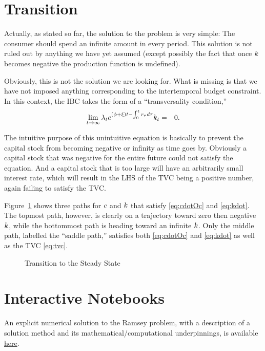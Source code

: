 \documentclass{handout}
\begin{document}
\section{Transition}

Actually, as stated so far, the solution to the problem is very simple: The
consumer should spend an infinite amount in every period.  This solution is 
not ruled out by anything we have yet assumed (except possibly the fact that
once ${k}$ becomes negative the production function is undefined).  

Obviously, this is not the solution we are looking for.  What is missing is
that we have not imposed anything corresponding to the intertemporal 
budget constraint.  In this context, the IBC takes the form of a ``transversality
condition,'' 
\begin{eqnarray}
  \label{eq:tvc}
  \lim_{t \rightarrow \infty} \lambda_{t} e^{(\phi +\xi) t - \int_{0}^{t} r_{\tau} d\tau }k_{t} & = & 0.
\end{eqnarray}

The intuitive purpose of this unintuitive equation is basically to prevent
the capital stock from becoming negative or infinity as time goes by.  
Obviously a capital stock that was negative for the entire future could not 
satisfy the equation.  And a capital stock that is too large will have 
an arbitrarily small interest rate, which will result in the LHS of the 
TVC being a positive number, again failing to satisfy the TVC.

Figure~\ref{fig:RamseySaddlePlot} shows three paths for $c$ and ${k}$
that satisfy \eqref{eq:cdotOc} and \eqref{eq:kdot}.  The topmost path,
however, is clearly on a trajectory toward zero then negative
${k}$, while the bottommost path is heading toward an infinite
${k}$.  Only the middle path, labelled the ``saddle path,'' satisfies
both \eqref{eq:cdotOc} and \eqref{eq:kdot} as well as the TVC
\eqref{eq:tvc}.

\begin{figure}
  \caption{Transition to the Steady State}\label{fig:RamseySaddlePlot}
\end{figure}

\section{Interactive Notebooks}

An explicit numerical solution to the Ramsey problem, with a description of a solution method and its
mathematical/computational underpinnings, is available \href{https://github.com/llorracc/Jupyter/blob/master/notebooks/RamseyCassKoopmans.ipynb}{here}.
\end{document}
